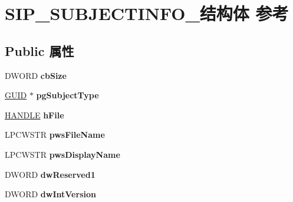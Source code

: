 \hypertarget{struct_s_i_p___s_u_b_j_e_c_t_i_n_f_o__}{}\section{S\+I\+P\+\_\+\+S\+U\+B\+J\+E\+C\+T\+I\+N\+F\+O\+\_\+结构体 参考}
\label{struct_s_i_p___s_u_b_j_e_c_t_i_n_f_o__}
\subsection*{Public 属性}
\begin{DoxyCompactItemize}
\item 
\mbox{\label{struct_s_i_p___s_u_b_j_e_c_t_i_n_f_o___acb8baee5b4cf71f732823223f234d61f}} 
D\+W\+O\+RD {\bfseries cb\+Size}
\item 
\mbox{\label{struct_s_i_p___s_u_b_j_e_c_t_i_n_f_o___ab4b537ec35c3686fc67fe6e3c33b08e8}} 
\hyperlink{interface_g_u_i_d}{G\+U\+ID} $\ast$ {\bfseries pg\+Subject\+Type}
\item 
\mbox{\label{struct_s_i_p___s_u_b_j_e_c_t_i_n_f_o___a208d34a71109d06253c298e0016996e3}} 
\hyperlink{interfacevoid}{H\+A\+N\+D\+LE} {\bfseries h\+File}
\item 
\mbox{\label{struct_s_i_p___s_u_b_j_e_c_t_i_n_f_o___a9880c1dbe1f979e928caa07a8360477c}} 
L\+P\+C\+W\+S\+TR {\bfseries pws\+File\+Name}
\item 
\mbox{\label{struct_s_i_p___s_u_b_j_e_c_t_i_n_f_o___abc3dd2deab4bdb649e567db26d2bcc29}} 
L\+P\+C\+W\+S\+TR {\bfseries pws\+Display\+Name}
\item 
\mbox{\label{struct_s_i_p___s_u_b_j_e_c_t_i_n_f_o___ad84fd726f6e4f90a81f85b72a2374288}} 
D\+W\+O\+RD {\bfseries dw\+Reserved1}
\item 
\mbox{\label{struct_s_i_p___s_u_b_j_e_c_t_i_n_f_o___ab38c32c9f3697b1a3aebb852d97b6c83}} 
D\+W\+O\+RD {\bfseries dw\+Int\+Version}

\end{DoxyCompactItemize}
